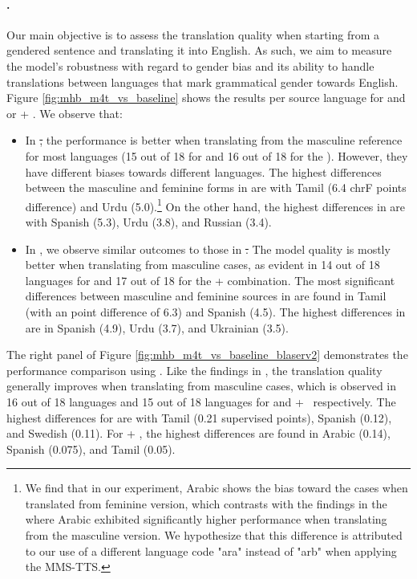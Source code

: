 \paragraph{\xeng.} Our main objective is to assess the translation quality when starting from a gendered sentence and translating it into English. %
As such, we aim to measure the model's robustness with regard to gender bias and its ability to handle translations between languages that mark grammatical gender towards English. Figure \ref{fig:mhb_m4t_vs_baseline} shows the results per source language for \mfourtlg and \whisperlarge or \whisperlarge + \yourtts. We observe that:

\begin{itemize}
    \item In \st, the performance is better when translating from the masculine reference for most languages (15 out of 18 for \mfourtlg and 16 out of 18 for the \whisperlarge). However, they have different biases towards different languages. The highest differences between the masculine and feminine forms in \mfourtlg are with Tamil (6.4 chrF points difference) and Urdu (5.0).\footnote{We find that in our experiment, Arabic shows the bias toward the cases when translated from feminine version, which contrasts with the findings in the \multilingualholisticbias \citep{costa2023multilingual} where Arabic exhibited significantly higher performance when translating from the masculine version. We hypothesize that this difference is attributed to our use of a different language code "ara" instead of "arb" when applying the MMS-TTS.} On the other hand, the highest differences in \whisperlarge are with Spanish (5.3), Urdu (3.8), and Russian (3.4).

\item In \sst, we observe similar outcomes to those in \st. The model quality is mostly better when translating from masculine cases, as evident in 14 out of 18 languages for \mfourtlg and 17 out of 18 for the \whisperlarge + \yourtts combination. The most significant differences between masculine and feminine sources in \mfourtlg are found in Tamil (with an \asrchrf point difference of 6.3) and Spanish (4.5). The highest differences in \whisperlarge are in Spanish (4.9), Urdu (3.7), and Ukrainian (3.5). %

\end{itemize}

The right panel of Figure \ref{fig:mhb_m4t_vs_baseline_blaserv2} demonstrates the performance comparison using \blaser. Like the findings in \asrchrf, the translation quality generally improves when translating from masculine cases, which is observed in 16 out of 18 languages and 15 out of 18 languages for \mfourtlg and \whisperlarge + \yourtts\ respectively. The highest differences for \mfourtlg are with Tamil (0.21 supervised \blaser points), Spanish (0.12), and Swedish (0.11). For \whisperlarge + \yourtts, the highest differences are found in Arabic (0.14), Spanish (0.075), and Tamil (0.05).

